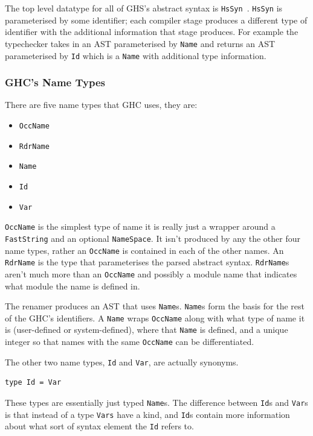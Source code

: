 The top level datatype for all of GHS's abstract syntax is \texttt{HsSyn}~\citep{ghcDesign}. \texttt{HsSyn} is parameterised by some identifier; each compiler stage produces a different type of identifier with the additional information that stage produces. For example the typechecker takes in an AST parameterised by \texttt{Name} and returns an AST parameterised by \texttt{Id} which is a \texttt{Name} with additional type information.

\subsubsection{GHC's Name Types}

There are five name types that GHC uses, they are:

\begin{itemize}
	\item \texttt{OccName}
	\item \texttt{RdrName}
	\item \texttt{Name}
	\item \texttt{Id}
	\item \texttt{Var}
\end{itemize}

\texttt{OccName} is the simplest type of name it is really just a wrapper around a \texttt{FastString} and an optional \texttt{NameSpace}. It isn't produced by any the other four name types, rather an \texttt{OccName} is contained in each of the other names. An \texttt{RdrName} is the type that parameterises the parsed abstract  syntax. \texttt{RdrName}s aren't much more than an \texttt{OccName} and possibly a module name that indicates what module the name is defined in.

The renamer produces an AST that uses \texttt{Name}s. \texttt{Name}s form the basis for the rest of the GHC's identifiers. A \texttt{Name} wraps \texttt{OccName} along with what type of name it is (user-defined or system-defined), where that \texttt{Name} is defined, and a unique integer so that names with the same \texttt{OccName} can be differentiated. 

The other two name types, \texttt{Id} and \texttt{Var}, are actually synonyms.

\begin{lstlisting}[frame=single,caption={Id's definition from Var.hs in~\cite{ghcHackage}}]
type Id = Var
\end{lstlisting}

These types are essentially just typed \texttt{Name}s. The difference between \texttt{Id}s and \texttt{Var}s is that instead of a type \texttt{Vars} have a kind, and \texttt{Id}s contain more information about what sort of syntax element the \texttt{Id} refers to. 

